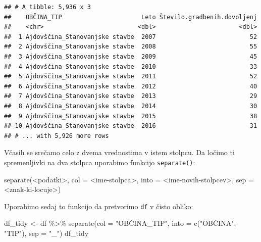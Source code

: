 \documentclass[
]{book}
\newenvironment{Shaded}{\begin{snugshade}}{\end{snugshade}}
\newcommand{\AttributeTok}[1]{\textcolor[rgb]{0.77,0.63,0.00}{#1}}
\newcommand{\FunctionTok}[1]{\textcolor[rgb]{0.00,0.00,0.00}{#1}}
\newcommand{\NormalTok}[1]{#1}
\newcommand{\OtherTok}[1]{\textcolor[rgb]{0.56,0.35,0.01}{#1}}
\newcommand{\SpecialCharTok}[1]{\textcolor[rgb]{0.00,0.00,0.00}{#1}}
\newcommand{\StringTok}[1]{\textcolor[rgb]{0.31,0.60,0.02}{#1}}
\begin{document}
\begin{verbatim}
## # A tibble: 5,936 x 3
##    OBČINA_TIP                      Leto Število.gradbenih.dovoljenj
##    <chr>                          <dbl>                       <dbl>
##  1 Ajdovščina_Stanovanjske stavbe  2007                          52
##  2 Ajdovščina_Stanovanjske stavbe  2008                          55
##  3 Ajdovščina_Stanovanjske stavbe  2009                          45
##  4 Ajdovščina_Stanovanjske stavbe  2010                          33
##  5 Ajdovščina_Stanovanjske stavbe  2011                          52
##  6 Ajdovščina_Stanovanjske stavbe  2012                          40
##  7 Ajdovščina_Stanovanjske stavbe  2013                          29
##  8 Ajdovščina_Stanovanjske stavbe  2014                          30
##  9 Ajdovščina_Stanovanjske stavbe  2015                          38
## 10 Ajdovščina_Stanovanjske stavbe  2016                          31
## # ... with 5,926 more rows
\end{verbatim}

Včasih se srečamo celo z dvema vrednostima v istem stolpcu. Da ločimo ti spremenljivki na dva stolpca uporabimo funkcijo \texttt{separate()}:

\begin{Shaded}
\begin{Highlighting}[]
\FunctionTok{separate}\NormalTok{(}\SpecialCharTok{\textless{}}\NormalTok{podatki}\SpecialCharTok{\textgreater{}}\NormalTok{, }\AttributeTok{col =} \SpecialCharTok{\textless{}}\NormalTok{ime}\SpecialCharTok{{-}}\NormalTok{stolpca}\SpecialCharTok{\textgreater{}}\NormalTok{, }\AttributeTok{into =} \SpecialCharTok{\textless{}}\NormalTok{ime}\SpecialCharTok{{-}}\NormalTok{novih}\SpecialCharTok{{-}}\NormalTok{stolpcev}\SpecialCharTok{\textgreater{}}\NormalTok{, }\AttributeTok{sep =} \SpecialCharTok{\textless{}}\NormalTok{znak}\SpecialCharTok{{-}}\NormalTok{ki}\SpecialCharTok{{-}}\NormalTok{locuje}\SpecialCharTok{\textgreater{}}\NormalTok{)}
\end{Highlighting}
\end{Shaded}

Uporabimo sedaj to funkcijo da pretvorimo \texttt{df} v čisto obliko:

\begin{Shaded}
\begin{Highlighting}[]
\NormalTok{df\_tidy }\OtherTok{\textless{}{-}}\NormalTok{ df }\SpecialCharTok{\%\textgreater{}\%}
  \FunctionTok{separate}\NormalTok{(}\AttributeTok{col =} \StringTok{"OBČINA\_TIP"}\NormalTok{, }\AttributeTok{into =} \FunctionTok{c}\NormalTok{(}\StringTok{"OBČINA"}\NormalTok{, }\StringTok{"TIP"}\NormalTok{), }\AttributeTok{sep =} \StringTok{"\_"}\NormalTok{)}
\NormalTok{df\_tidy}
\end{Highlighting}
\end{Shaded}
\end{document}
